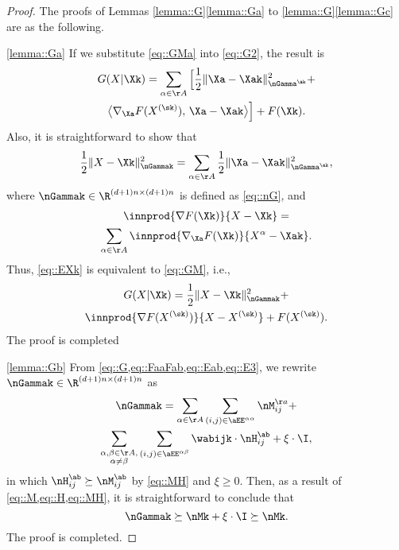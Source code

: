 \begin{proof} The proofs of Lemmas \ref{lemma::G}\ref{lemma::Ga} to \ref{lemma::G}\ref{lemma::Gc} are as the following.

\ref{lemma::Ga} If we substitute \cref{eq::GMa} into \cref{eq::G2}, the result is
\begin{multline}\label{eq::EXk}
	G(X|\Xk)=\sum_{\alpha\in\AA}\Big[\frac{1}{2}\|\Xa-\Xak\|_{\nGamma^{\ak}}^2+\\
	\big\langle\nabla_{\Xa} F(X^{(\sk)}),\,{\Xa-\Xak}\big\rangle\Big] + F(\Xk).
\end{multline}
Also, it is straightforward to show that
\begin{equation}
	\nonumber
	\frac{1}{2}\|X-\Xk\|_{\nGammak}^2=\sum_{\alpha\in\AA}\frac{1}{2}\|\Xa-\Xak\|_{\nGamma^{\ak}}^2,
\end{equation}
where $\nGammak\in\R^{(d+1)n\times(d+1)n}$ is defined as \cref{eq::nG}, and  
\begin{multline}
	\nonumber
	\innprod{\nabla F(\Xk)}{X-\Xk}=\\
	\sum_{\alpha\in\AA}\innprod{\nabla_{\Xa} F(\Xk)}{X^\alpha-\Xak}.
\end{multline}
Thus, \cref{eq::EXk} is equivalent to \cref{eq::GM}, i.e.,
\begin{multline}\label{eq::E3}
	G(X|\Xk) = \frac{1}{2}\|X-\Xk\|_{\nGammak}^2+\\
	\innprod{\nabla F(X^{(\sk)})}{{X-X^{(\sk)}}}+ F(X^{(\sk)}).
\end{multline}
The proof is completed
\vspace{0.2em}

\ref{lemma::Gb} From \cref{eq::G,eq::FaaFab,eq::Eab,eq::E3}, we rewrite $\nGammak\in\R^{(d+1)n\times(d+1)n}$ as
\begin{multline}\label{eq::H}
	\nGammak=\sum_{\alpha\in\AA}\sum_{(i,j)\in \aEE^{\alpha\alpha}}\nM_{ij}^{\aa}+\\
	\sum_{\substack{\alpha,\beta\in\AA,\\\alpha\neq \beta}}\sum_{(i,j)\in \aEE^{\alpha\beta}}\wabijk\cdot \nH_{ij}^{\ab}+\xi\cdot\I,
\end{multline}
in which $\nH_{ij}^{\ab}\succeq\nM_{ij}^{\ab}$ by \cref{eq::MH} and $\xi\geq 0$. Then, as a result of \cref{eq::M,eq::H,eq::MH}, it is straightforward to conclude that
\begin{equation}\label{eq::GMk}
	\nGammak\succeq\nMk+\xi \cdot\I\succeq \nMk.
\end{equation} 
The proof is completed.
\vspace{0.2em}


\end{proof}
